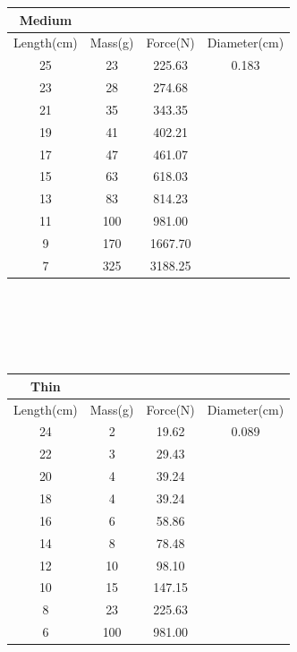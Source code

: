 \documentclass[12pt]{article}
\begin{document}
\centering
\begin{tabular}{|| c | c | c | c ||}
 \hline
 Medium &\ &\ &\ \\
 \hline
 Length(cm) & Mass(g) & Force(N) & Diameter(cm) \\
 \hline
 \hline
 25 & 23 & 225.63 & 0.183\\
 23 & 28 & 274.68 &\ \\
 21 & 35 & 343.35 &\ \\
 19 & 41 & 402.21 &\ \\
 17 & 47 & 461.07 &\ \\
 15 & 63 & 618.03 &\ \\
 13 & 83 & 814.23 &\ \\
 11 & 100 & 981.00 &\ \\
 9 & 170 & 1667.70 &\ \\
 7 & 325 & 3188.25 &\ \\
 \hline
\end{tabular}\\\ \\\ \\\ 

\centering
\begin{tabular}{|| c | c | c | c ||}
 \hline
 Thin &\ &\ &\ \\
 \hline
 Length(cm) & Mass(g) & Force(N) & Diameter(cm) \\
 \hline
 \hline
 24 & 2 & 19.62 & 0.089\\
 22 & 3 & 29.43 &\ \\
 20 & 4 & 39.24 &\ \\
 18 & 4 & 39.24 &\ \\
 16 & 6 & 58.86 &\ \\
 14 & 8 & 78.48 &\ \\
 12 & 10 & 98.10 &\ \\
 10 & 15 & 147.15 &\ \\
 8 & 23 & 225.63 &\ \\
 6 & 100 & 981.00 &\ \\
 \hline
\end{tabular}
\end{document}
